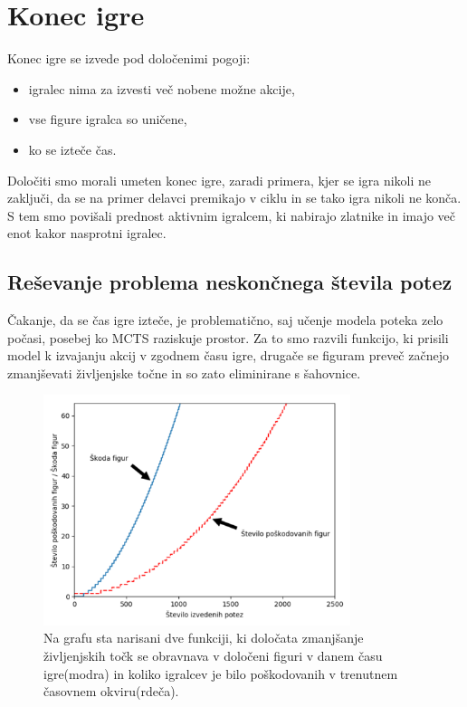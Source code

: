 \documentclass[a4paper, 12pt]{book}
\begin{document}
\section{Konec igre}
\label{sKonecIgre}
Konec igre se izvede pod določenimi pogoji:
\begin{itemize}
	\item igralec nima za izvesti več nobene možne akcije,
	\item vse figure igralca so uničene,
	\item ko se izteče čas.
\end{itemize}

Določiti smo morali umeten konec igre, zaradi primera, kjer se igra nikoli ne zaključi, da se na primer delavci premikajo v ciklu in se tako igra nikoli ne konča.
S tem smo povišali prednost aktivnim igralcem, ki nabirajo zlatnike in imajo več enot kakor nasprotni igralec.

\subsection{Reševanje problema neskončnega števila potez}
\label{sKillFunction}
Čakanje, da se čas igre izteče, je problematično, saj učenje modela poteka zelo počasi, posebej ko MCTS raziskuje prostor.
Za to smo razvili funkcijo, ki prisili model k izvajanju akcij v zgodnem času igre, drugače se figuram preveč začnejo zmanjševati življenjske točne in so zato eliminirane s šahovnice.


\begin{figure}[h]
	\begin{center}
		\includegraphics[width=0.8\textwidth]{photos/destroy_formula_2018_11_17.pdf}
	\end{center}
	\caption{Na grafu sta narisani dve funkciji, ki določata zmanjšanje življenjskih točk se obravnava v določeni figuri v danem času igre(modra) in koliko igralcev je bilo poškodovanih v trenutnem časovnem okviru(rdeča).}
	\label{destroy_formula_2018_11_17}
\end{figure}
\end{document}
